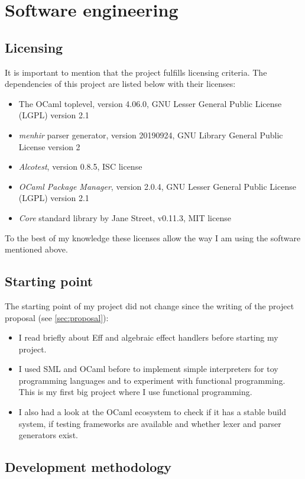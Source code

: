 \documentclass[class=article, crop=false]{standalone}
\begin{document}
\section{Software engineering}

\subsection{Licensing}

It is important to mention that the project fulfills licensing criteria. The
dependencies of this project are listed below with their licenses:
\begin{itemize}
\item The OCaml toplevel, version 4.06.0, GNU Lesser General Public License (LGPL) version 2.1
\item \emph{menhir} parser generator, version 20190924, GNU Library General Public License version 2
\item \emph{Alcotest}, version 0.8.5, ISC license
\item \emph{OCaml Package Manager}, version 2.0.4, GNU Lesser General Public License (LGPL) version 2.1
\item \emph{Core} standard library by Jane Street, v0.11.3, MIT license
\end{itemize}
To the best of my knowledge these licenses allow the way I am using the software
mentioned above.

\subsection{Starting point}

The starting point of my project did not change since the writing of the
project proposal (see \autoref{sec:proposal}):
\begin{itemize}
  \item I read briefly about Eff and algebraic effect handlers before starting
  my project.
  \item I used SML and OCaml before to implement simple interpreters for toy
  programming languages and to experiment with functional programming. This is
  my first big project where I use functional programming.
  \item I also had a look at the OCaml ecosystem to check if it has a stable
  build system, if testing frameworks are available and whether lexer and parser
  generators exist.
\end{itemize}

\subsection{Development methodology}
\end{document}
